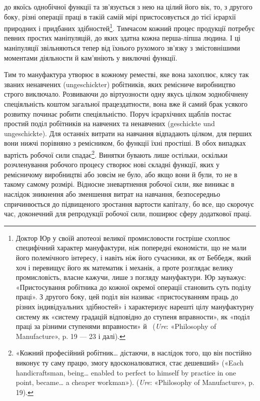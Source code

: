 \parcont{}  %
до якоїсь однобічної функції та зв’язується з нею на цілий його
вік, то, з другого боку, різні операції праці в такій самій мірі
пристосовується до тієї ієрархії природних і придбаних здібностей\footnote{
Доктор Юр у своїй апотеозі великої промисловости гостріше
схоплює специфічний характер мануфактури, ніж попередні економісти,
що не мали його полемічного інтересу, і навіть ніж його сучасники,
як от Беббедж, який хоч і перевищує його як математик і механік, а проте
розглядає велику промисловість, власне кажучи, лише з погляду мануфактури.
Юр зауважує: «Пристосування робітника до кожної окремої
операції становить суть поділу праці». З другого боку, цей поділ він називає
«пристосуванням праць до різних індивідуальних здібностей» і характеризує
нарешті цілу мануфактурну систему як «систему градацій
відповідно до ступеня вправности», як «поділ праці за різними ступенями
вправности» й~ (\emph{Ure}: «Philosophy of Manufacture», p. 19 —
23 і далі).
}. Тимчасом кожний процес продукції потребує певних
простих маніпуляцій, до яких здатна кожна перша-ліпша людина.
І ці маніпуляції звільняються тепер від їхнього рухомого
зв’язку з змістовнішими моментами діяльности й кам’яніють у
виключні функції.

Тим то мануфактура утворює в кожному реместві, яке вона
захоплює, клясу так званих ненавчених (ungeschickter) робітників,
яких ремісниче виробництво строго виключало. Розвиваючи
до віртуозности одну якусь цілком зоднобічнену спеціяльність
коштом загальної працездатности, вона вже й самий брак усякого
розвитку починає робити спеціяльністю. Поруч ієрархічних
щаблів постає простий поділ робітників на навчених та ненавчених
(geschickte und ungeschickte). Для останніх витрати
на навчання відпадають цілком, для перших вони нижчі порівняно
з ремісником, бо функції їхні простіші. В обох випадках вартість
робочої сили спадає\footnote{
«Кожний професійний робітник\dots{} дістаючи, в наслідок того,
що він постійно виконує ту саму працю, змогу вдосконалюватися, стає
дешевший» («Each handicraftsman, being\dots{} enabled to perfect to himself
by practice in one point, became\dots{} a cheaper workman»). (\emph{Ure}:
«Philosophy of Manufacture», p. 19).
}. Винятки бувають лише остільки, оскільки
розчленування робочого процесу створює нові складні функції,
яких у ремісничому виробництві або зовсім не було, або якщо вони
й були, то не в такому самому розмірі. Відносне зневартнення
робочої сили, яке виникає в наслідок зникнення або зменшення
витрат на навчання, безпосередньо спричинюється до підвищеного
зростання вартости капіталу, бо все, що скорочує час, доконечний
для репродукції робочої сили, поширює сферу додаткової
праці.

